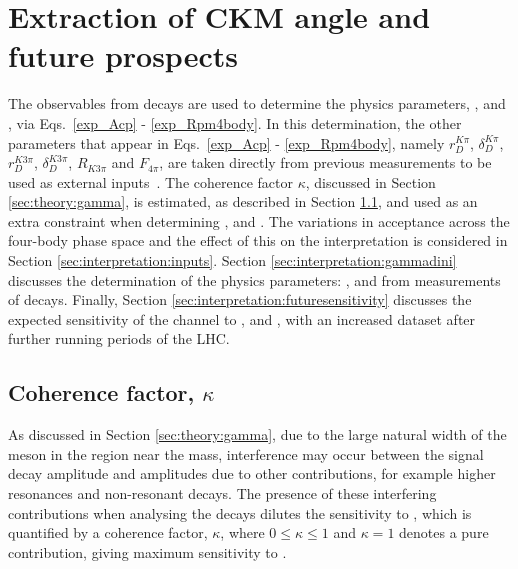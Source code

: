 \clearpage
%

\chapter{\label{ch:6-interpretation}Extraction of CKM angle \Pgamma and future prospects} 


The \CP observables from \btodkst decays are used to determine the physics parameters, \rb, \deltab and \Pgamma, via Eqs.~\ref{exp_Acp} - \ref{exp_Rpm4body}. In this determination, the other parameters that appear in Eqs.~\ref{exp_Acp} - \ref{exp_Rpm4body}, namely $r_D^{K\pi}$, $\delta_D^{K\pi}$, $r_D^{K3\pi}$, $\delta_D^{K3\pi}$, $R_{K3\pi}$ and $F_{4\pi}$, are taken directly from previous measurements to be used as external inputs~\cite{HFAG,charmk3pi,charmk3pi_errata,LHCb-PAPER-2015-057,charm4pi}. The coherence factor $\kappa$, discussed in Section \ref{sec:theory:gamma}, is estimated, as described in Section \ref{sec:interpretation:coherence}, and used as an extra constraint when determining \rb, \deltab and \Pgamma. The variations in acceptance across the four-body phase space and the effect of this on the interpretation is considered in Section \ref{sec:interpretation:inputs}. Section \ref{sec:interpretation:gammadini} discusses the determination of the physics parameters: \rb, \deltab and \Pgamma from measurements of \btodkst decays. Finally, Section \ref{sec:interpretation:futuresensitivity} discusses the expected sensitivity of the \btodkst channel to \rb, \deltab and \Pgamma, with an increased dataset after further running periods of the LHC.

\section{Coherence factor, $\kappa$}
\label{sec:interpretation:coherence}

As discussed in Section \ref{sec:theory:gamma}, due to the large natural width of the \Kstarm meson in the region near the \Kstarm mass, interference may occur between the signal \Kstarm decay amplitude and amplitudes due to other \decay{\Bm}{\D\KS\pim} contributions, for example higher \KS\pim resonances and non-resonant decays. The presence of these interfering contributions when analysing the \btodkst decays dilutes the sensitivity to \Pgamma, which is quantified by a coherence factor, $\kappa$, where $0 \leq \kappa \leq 1$ and $\kappa = 1$ denotes a pure \Kstarm contribution, giving maximum sensitivity to \Pgamma. 


